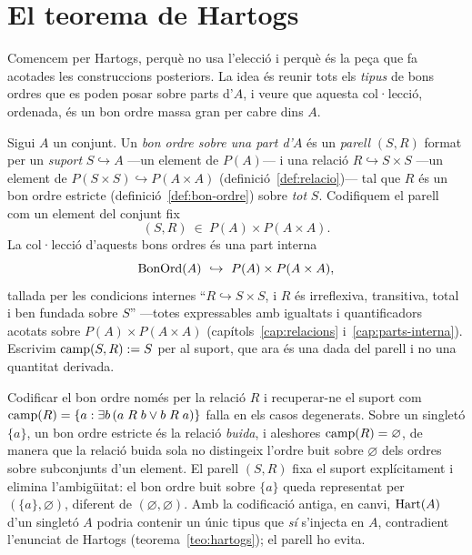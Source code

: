 \section{El teorema de Hartogs}\label{sec:hartogs}

Comencem per Hartogs, perquè no usa l'elecció i perquè és la peça que fa
acotades les construccions posteriors. La idea és reunir tots els
\emph{tipus} de bons ordres que es poden posar sobre parts d'\(A\), i veure
que aquesta col·lecció, ordenada, és un bon ordre massa gran per cabre dins
\(A\).

\begin{definicio}\label{def:bons-ordres-parts}
Sigui \(A\) un conjunt. Un \emph{bon ordre sobre una part d'\(A\)} és un
\emph{parell} \((S,R)\) format per un \emph{suport} \(S\hookrightarrow A\)
---un element de \(P(A)\)--- i una relació \(R\hookrightarrow S\times S\)
---un element de \(P(S\times S)\hookrightarrow P(A\times A)\)
(definició~\ref{def:relacio})--- tal que \(R\) és un bon ordre estricte
(definició~\ref{def:bon-ordre}) sobre \emph{tot} \(S\). Codifiquem el parell
com un element del conjunt fix
\[
(S,R)\ \in\ P(A)\times P(A\times A).
\]
La col·lecció d'aquests bons ordres és una part interna
\[
\operatorname{BonOrd}(A)\ \hookrightarrow\ P(A)\times P(A\times A),
\]
tallada per les condicions internes \enquote{\(R\hookrightarrow S\times S\), i
\(R\) és irreflexiva, transitiva, total i ben fundada sobre \(S\)} ---totes
expressables amb igualtats i quantificadors acotats sobre
\(P(A)\times P(A\times A)\) (capítols~\ref{cap:relacions}
i~\ref{cap:parts-interna}). Escrivim \(\operatorname{camp}(S,R):=S\) per al suport, que ara
és una dada del parell i no una quantitat derivada.
\end{definicio}

\begin{observacio}\label{obs:parell-suport}
Codificar el bon ordre només per la relació \(R\) i recuperar-ne el suport
com \(\operatorname{camp}(R)=\{a: \exists b\,(a\mathrel R b\vee b\mathrel R a)\}\) falla en
els casos degenerats. Sobre un singletó \(\{a\}\), un bon ordre estricte és la
relació \emph{buida}, i aleshores \(\operatorname{camp}(R)=\varnothing\), de manera que la
relació buida sola no distingeix l'ordre buit sobre \(\varnothing\) dels
ordres sobre subconjunts d'un element. El parell \((S,R)\) fixa el suport
explícitament i elimina l'ambigüitat: el bon ordre buit sobre \(\{a\}\) queda
representat per \((\{a\},\varnothing)\), diferent de
\((\varnothing,\varnothing)\). Amb la codificació antiga, en canvi,
\(\operatorname{Hart}(A)\) d'un singletó \(A\) podria contenir un únic tipus que
\emph{sí} s'injecta en \(A\), contradient l'enunciat de Hartogs
(teorema~\ref{teo:hartogs}); el parell ho evita.
\end{observacio}

